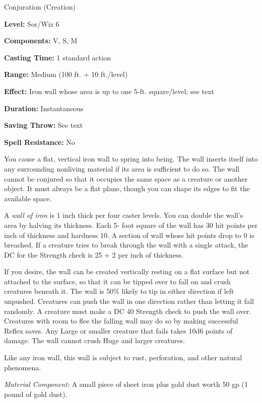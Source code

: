 
Conjuration (Creation)

\textbf{Level:} Sor/Wiz 6

\textbf{Components:} V, S, M

\textbf{Casting Time:} 1 standard action

\textbf{Range:} Medium (100 ft. + 10 ft./level)

\textbf{Effect:} Iron wall whose area is up to one 5-ft. square/level; see text

\textbf{Duration:} Instantaneous

\textbf{Saving Throw:} See text

\textbf{Spell Resistance:} No

You cause a flat, vertical iron wall to spring into being. The wall inserts itself 
into any surrounding nonliving material if its area is sufficient to do so. The 
wall cannot be conjured so that it occupies the same space as a creature or another 
object. It must always be a flat plane, though you can shape its edges to fit the 
available space.

A \textit{wall of iron} is 1 inch thick per four caster levels. You can double 
the wall's area by halving its thickness. Each 5- foot square of the wall has 30 
hit points per inch of thickness and hardness 10. A section of wall whose hit points 
drop to 0 is breached. If a creature tries to break through the wall with a single 
attack, the DC for the Strength check is 25 + 2 per inch of thickness.

If you desire, the wall can be created vertically resting on a flat surface but 
not attached to the surface, so that it can be tipped over to fall on and crush 
creatures beneath it. The wall is 50\% likely to tip in either direction if left 
unpushed. Creatures can push the wall in one direction rather than letting it fall 
randomly. A creature must make a DC 40 Strength check to push the wall over. Creatures 
with room to flee the falling wall may do so by making successful Reflex saves. 
Any Large or smaller creature that fails takes 10d6 points of damage. The wall 
cannot crush Huge and larger creatures.

Like any iron wall, this wall is subject to rust, perforation, and other natural 
phenomena.

\textit{Material Component:} A small piece of sheet iron plus gold dust worth 50 
gp (1 pound of gold dust).

